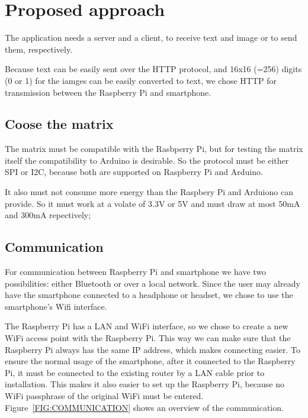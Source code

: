 \documentclass[conference]{IEEEtran}
\begin{document}
\section{Proposed approach}
The application needs a server and a client, to receive text and image or to send them, respectively.

Because text can be easily sent over the HTTP protocol, and 16x16 (=256) digits (0 or 1) for the iamges can be easily converted to text, we chose HTTP for transmission between the Raspberry Pi and smartphone.


\subsection{Coose the matrix}
The matrix must be compatible with the Rasbperry Pi, but for testing the matrix itself the compatibility to Arduino is desirable. So the protocol must be either SPI or I2C, because both are supported on Raspberry Pi and Arduino.

It also must not consume more energy than the Raspbery Pi and Arduiono can provide. So it must work at a volate of 3.3V or 5V and must draw at most 50mA and 300mA repectively\cite{b0};


\subsection{Communication}
For communication between Raspberry Pi and smartphone we have two possibilities: either Bluetooth or over a local network. Since the user may already have the smartphone connected to a headphone or headset, we chose to use the smartphone's Wifi interface.

The Raspberry Pi has a LAN and WiFi interface, so we chose to create a new WiFi access point with the Raspberry Pi. This way we can make sure that the Raspberry Pi always has the same IP address, which makes connecting easier. To ensure the normal usage of the smartphone, after it connected to the Raspberry Pi, it must be connected to the existing router by a LAN cable prior to installation. This makes it also easier to set up the Raspberry Pi, because no WiFi passphrase of the original WiFi must be entered. Figure~\ref{FIG:COMMUNICATION} shows an overview of the communication.
\end{document}
